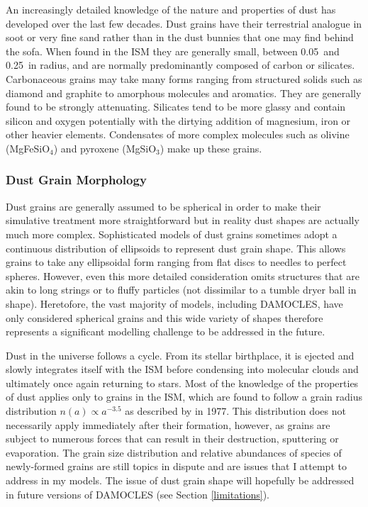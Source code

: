 An increasingly detailed knowledge of the nature and properties of dust has developed over the last few decades. Dust grains have their terrestrial analogue in soot or very fine sand rather than in the dust bunnies that one may find behind the sofa.  When found in the ISM they are generally small, between 0.05\micron\ and 0.25\micron\ in radius, and are normally predominantly composed of carbon or silicates.  Carbonaceous grains may take many forms ranging from structured solids such as diamond and graphite to amorphous molecules and aromatics.  They are generally found to be strongly attenuating.  Silicates tend to be more glassy and contain silicon and oxygen potentially with the dirtying addition of magnesium, iron or other heavier elements.  Condensates of more complex molecules such as olivine (MgFeSiO$_4$) and pyroxene (MgSiO$_3$) make up these grains.  


\subsubsection{Dust Grain Morphology} 

Dust grains are generally assumed to be spherical in order to make their simulative treatment more straightforward but in reality dust shapes are actually much more complex.  Sophisticated models of dust grains sometimes adopt a continuous distribution of ellipsoids to represent dust grain shape.  This allows grains to take any ellipsoidal form ranging from flat discs to needles to perfect spheres.  However, even this more detailed consideration omits structures that are akin to long strings or to fluffy particles (not dissimilar to a tumble dryer ball in shape). Heretofore, the vast majority of models, including DAMOCLES, have only considered spherical grains and this wide variety of shapes therefore represents a significant modelling challenge to be addressed in the future.

Dust in the universe follows a cycle.  From its stellar birthplace, it is ejected and slowly integrates itself with the ISM before condensing into molecular clouds and ultimately once again returning to stars.  Most of the knowledge of the properties of dust applies only to grains in the ISM, which are found to follow a grain radius distribution $n(a) \propto a^{-3.5}$ as described by \citeauthor{Mathis1977} in 1977.  This distribution does not necessarily apply immediately after their formation, however, as grains are subject to numerous forces that can result in their destruction, sputtering or evaporation.  The grain size distribution and relative abundances of species of newly-formed grains are still topics in dispute and are issues that I attempt to address in my models.  The issue of dust grain shape will hopefully be addressed in future versions of DAMOCLES (see Section \ref{limitations}).

